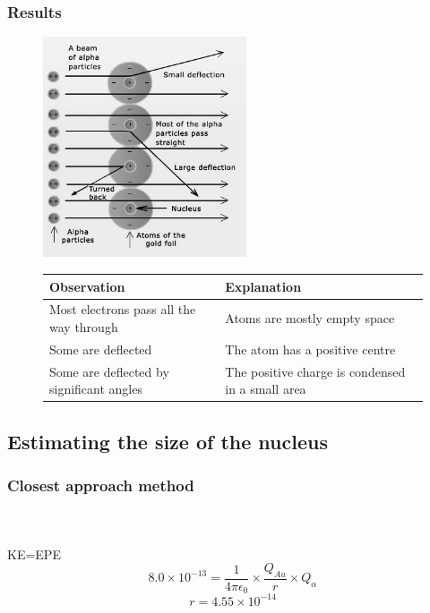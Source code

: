 \documentclass{article}[18pt]
\begin{document}
\subsubsection{Results}

\begin{figure}[h]
    \centering
    \begin{minipage}{0.45\textwidth}
        \centering
        
\includegraphics[width=6cm]{foil.jpg}  
    \end{minipage}\hfill
    \begin{minipage}{0.45\textwidth}
        \centering
\begin{tabularx}{\textwidth}{|X|X|}
\hline
Observation&Explanation\\
\hline
Most electrons pass all the way through&Atoms are mostly empty space\\
\hline
Some are deflected&The atom has a positive centre\\
\hline
Some are deflected by significant angles&The positive charge is condensed in a small area\\
\hline
\end{tabularx}
    \end{minipage}
\end{figure}
\subsection{Estimating the size of the nucleus}  
\subsubsection{Closest approach method}
\\
\\
KE=EPE
$$8.0\times10^{-13}=\frac{1}{4\pi\epsilon_0}\times\frac{Q_{Au}}{r}\times Q_{\alpha}$$
$$r=4.55\times10^{-14}$$
\end{document}
